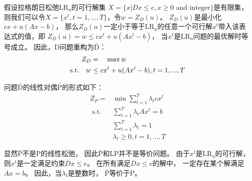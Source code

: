 假设拉格朗日松弛$\mathrm{LR_u}$的可行解集
$X=\{x|Dx\le e ,x\ge 0 \text{ and integer}\}$是有限集，
则我们可以令$X=\{x^t,t=1,...,T\}$，令$w = Z_D(u)$。
$Z_D(u)$是最小化$c x + u(Ax-b)$，
那么$Z_D(u)$一定小于等于$\mathrm{LR_u}$的任意一个可行解$x^t$带入该表达式的值，即
$Z_D(u) = w \le cx^t + u(Ax^t-b)$，
当$x^t$是$\mathrm{LR_u}$问题的最优解时等号成立。
因此，D问题重构为$\mathrm{\bar{D}}$：
\begin{equation}
\begin{aligned}
Z_D&=\quad {\rm{max}}\,w\\
\text{s.t.}\quad w &\le cx^t + u(Ax^t-b),t=1,...,T\\
\end{aligned}
\end{equation}

问题$\mathrm{\bar{D}}$的线性对偶$\mathrm{\bar{P}}$的形式如下：
\begin{equation}
\begin{aligned}
  Z_{P}= & \min \sum_{t=1}^{T} \lambda_{t} c x^{t} \\
  \text { s.t. } & \sum_{t=1}^{T} \lambda_{t} A x^{t}=b \\
  & \sum_{t=1}^{T} \lambda_{t}=1 \\
  & \lambda_{t} \geq 0, t=1, \ldots, T
\end{aligned}
\end{equation}

显然$\mathrm{\bar{P}}$不是P的线性松弛，
因此$\mathrm{\bar{P}}$和LP并不是等价问题。
由于$x^t$是$\mathrm{LR_u}$的可行解，
则$x^t$是一定满足约束$Dx \le e$。
在所有满足$Dx \le e$的解中，
一定存在某个解满足$Ax=b$。
因此，当$\lambda_t$是整数时，
$\mathrm{\bar{P}}$等价于P。

